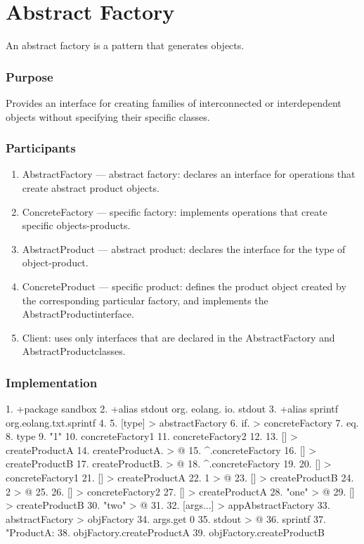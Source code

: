 \documentclass[12pt]{book}
\begin{document}
\section{Abstract Factory}
An abstract factory is a pattern that generates objects.

\subsubsection{Purpose}
Provides an interface for creating families of interconnected or interdependent objects without specifying their specific classes.

\subsubsection{Participants}
\begin{enumerate}
    \item AbstractFactory — abstract factory: declares an interface for operations that create abstract product objects.
    \item ConcreteFactory — specific factory: implements operations that create specific objects-products.
    \item AbstractProduct — abstract product: declares the interface for the type of object-product.
    \item ConcreteProduct — specific product: defines the product object created by the corresponding particular factory, and implements the AbstractProductinterface.
    \item Client: uses only interfaces that are declared in the AbstractFactory and  AbstractProductclasses.
\end{enumerate}

\subsubsection{Implementation}
\begin{ffcode}
1.	+package sandbox
2.	+alias stdout org. eolang. io. stdout
3.	+alias sprintf org.eolang.txt.sprintf
4.	
5.	[type] > abstractFactory
6.	  if. > concreteFactory
7.	    eq.
8.	      type
9.	      "1"
10.	    concreteFactory1
11.	    concreteFactory2
12.	
13.	  [] > createProductA
14.	    createProductA. > @
15.	      ^.concreteFactory
16.	  [] > createProductB
17.	    createProductB. > @
18.	      ^.concreteFactory
19.	
20.	[] > concreteFactory1
21.	  [] > createProductA
22.	    1 > @
23.	  [] > createProductB
24.	    2 > @
25.	
26.	[] > concreteFactory2
27.	  [] > createProductA
28.	    "one" > @
29.	  [] > createProductB
30.	    "two" > @
31.	
32.	[args...] > appAbstractFactory
33.	  abstractFactory > objFactory
34.	    args.get 0
35.	  stdout > @
36.	    sprintf
37.	      "ProductA: %
38.	      objFactory.createProductA
39.	      objFactory.createProductB 

\end{ffcode}
\end{document}
